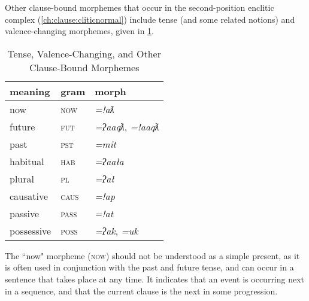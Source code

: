 Other clause-bound morphemes that occur in the second-position enclitic complex (\ref{ch:clause:cliticnormal}) include tense (and some related notions) and valence-changing morphemes, given in \cref{table:tense}.

\begin{table}[ht]
\centering
\caption{Tense, Valence-Changing, and Other Clause-Bound Morphemes}
\label{table:tense}
\begin{tabular}{lll}
meaning                        & gram               & morph                        \\ \hline
\multicolumn{1}{|l|}{now}      & \multicolumn{1}{l|}{\textsc{now}}   & \multicolumn{1}{l|}{\textit{=!aƛ}}     \\ \hline
\multicolumn{1}{|l|}{future}   & \multicolumn{1}{l|}{\textsc{fut}}   & \multicolumn{1}{l|}{\textit{=ʔaaqƛ}, \textit{=!aaqƛ}}   \\ \hline
\multicolumn{1}{|l|}{past}     & \multicolumn{1}{l|}{\textsc{pst}}   & \multicolumn{1}{l|}{\textit{=mit}}     \\ \hline
\multicolumn{1}{|l|}{habitual} & \multicolumn{1}{l|}{\textsc{hab}} & \multicolumn{1}{l|}{\textit{=ʔaała}}    \\ \hline
\multicolumn{1}{|l|}{plural\footnotemark} & \multicolumn{1}{l|}{\textsc{pl}} & \multicolumn{1}{l|}{\textit{=ʔał}}    \\ \hline
\multicolumn{1}{|l|}{causative}  & \multicolumn{1}{l|}{\textsc{caus}} & \multicolumn{1}{l|}{\textit{=!ap}}      \\ \hline
\multicolumn{1}{|l|}{passive\footnotemark}    & \multicolumn{1}{l|}{\textsc{pass}} & \multicolumn{1}{l|}{\textit{=!at}}      \\ \hline
\multicolumn{1}{|l|}{possessive} & \multicolumn{1}{l|}{\textsc{poss}} & \multicolumn{1}{l|}{\textit{=ʔak}, \textit{=uk}} \\ \hline
\end{tabular}
\end{table}

\addtocounter{footnote}{-1}
\addtocounter{footnote}{1}

The ``now" morpheme (\textsc{now}) should not be understood as a simple present, as it is often used in conjunction with the past and future tense, and can occur in a sentence that takes place at any time. It indicates that an event is occurring next in a sequence, and that the current clause is the next in some progression.

